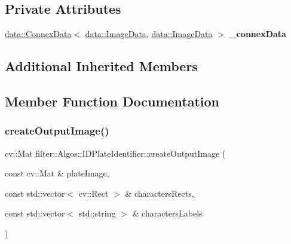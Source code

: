 \subsection*{Private Attributes}
\begin{DoxyCompactItemize}
\item 
\mbox{\label{classfilter_1_1_algos_1_1_i_d_plate_identifier_a67e49e1280f3d2facd2b53de56c22ee4}} 
\hyperlink{classfilter_1_1data_1_1_connex_data}{data\+::\+Connex\+Data}$<$ \hyperlink{classfilter_1_1data_1_1_image_data}{data\+::\+Image\+Data}, \hyperlink{classfilter_1_1data_1_1_image_data}{data\+::\+Image\+Data} $>$ {\bfseries \+\_\+connex\+Data}
\end{DoxyCompactItemize}
\subsection*{Additional Inherited Members}


\subsection{Member Function Documentation}
\mbox{\label{classfilter_1_1_algos_1_1_i_d_plate_identifier_a954615df7d4060998e69fda73fa9a416}} 
\subsubsection{\texorpdfstring{create\+Output\+Image()}{createOutputImage()}}
{\footnotesize\ttfamily cv\+::\+Mat filter\+::\+Algos\+::\+I\+D\+Plate\+Identifier\+::create\+Output\+Image (\begin{DoxyParamCaption}\item[{const cv\+::\+Mat \&}]{plate\+Image,  }\item[{const std\+::vector$<$ cv\+::\+Rect $>$ \&}]{characters\+Rects,  }\item[{const std\+::vector$<$ std\+::string $>$ \&}]{characters\+Labels }\end{DoxyParamCaption})\hspace{0.3cm}{\ttfamily [private]}}


